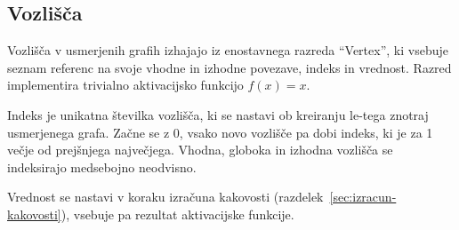 \documentclass[a4paper,12pt,openright]{book}
\begin{document}
    \subsection{Vozlišča}\label{subsec:vozlisca}
    Vozlišča v usmerjenih grafih izhajajo iz enostavnega razreda \enquote{Vertex}, ki vsebuje seznam referenc
    na svoje vhodne in izhodne povezave, indeks in vrednost.
    Razred implementira trivialno aktivacijsko funkcijo $f(x)=x$.

    Indeks je unikatna številka vozlišča, ki se nastavi ob kreiranju le-tega znotraj usmerjenega grafa.
    Začne se z 0, vsako novo vozlišče pa dobi indeks, ki je za 1 večje od prejšnjega največjega.
    Vhodna, globoka in izhodna vozlišča se indeksirajo medsebojno neodvisno.

    Vrednost se nastavi v koraku izračuna kakovosti (razdelek~\ref{sec:izracun-kakovosti}), vsebuje pa rezultat aktivacijske funkcije.
\end{document}
